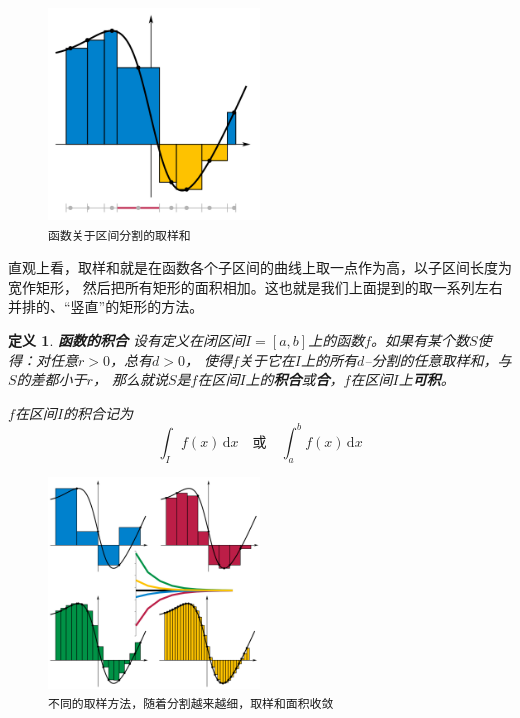 \documentclass[12pt,UTF8]{ctexbook}
\newcommand{\di}[1]{\,\mathrm{d}#1}
\newtheorem{df}{定义}[section]
\begin{document}
\begin{figure}[h] %
    \vspace{4pt}
    \centering
    \includegraphics[width=0.5\textwidth]{积分定义4.png} %
    \caption*{\texttt{函数关于区间分割的取样和}}
\end{figure}

直观上看，取样和就是在函数各个子区间的曲线上取一点作为高，以子区间长度为宽作矩形，
然后把所有矩形的面积相加。这也就是我们上面提到的取一系列左右并排的、“竖直”的矩形的方法。

\begin{df}{\textbf{函数的积合}}
    设有定义在闭区间$I=[a, b]$上的函数$f$。如果有某个数$S$使得：对任意$r>0$，总有$d>0$，
    使得$f$关于它在$I$上的所有$d$–分割的任意取样和，与$S$的差都小于$r$，
    那么就说$S$是$f$在区间$I$上的\textbf{积合}或\textbf{合}，$f$在区间$I$上\textbf{可积}。
    
    $f$在区间$I$的积合记为
    $$ \int_I f(x)\di{x} \quad \mbox{或} \quad \int_a^b f(x)\di{x} $$
\end{df}

\begin{figure}[h] %
    \vspace{4pt}
    \centering
    \includegraphics[width=0.5\textwidth]{积分定义6.png} %
    \caption*{\texttt{不同的取样方法，随着分割越来越细，取样和面积收敛}}
\end{figure}
\end{document}
